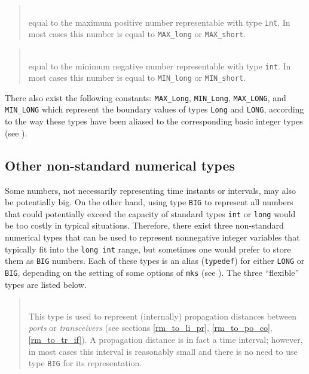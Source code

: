 \begin{quote}
\noindent{}\\ \hspace{0in}
equal to the maximum positive number representable with type {\tt int}.
In most cases this number is equal to {\tt MAX\_long} or {\tt MAX\_short}.
\end{quote}

\begin{quote}
\noindent{}\\ \hspace{0in}
equal to the minimum negative number representable with type {\tt int}.
In most cases this number is equal to {\tt MIN\_long} or {\tt MIN\_short}.
\end{quote}\medskip

There also exist the following constants: {\tt MAX\_Long}, {\tt MIN\_Long},
{\tt MAX\_LONG}, and {\tt MIN\_LONG} which represent the boundary values of
types {\tt Long} and {\tt LONG}, according to the way these types have been
aliased to the corresponding basic integer types (see ).

\subsection {Other non-standard numerical types}
\label {rm_mp_ot}

Some numbers, not necessarily representing time instants or intervals,
may also be potentially big.
On the other hand, using type {\tt BIG} to represent all numbers that
could potentially exceed the capacity of standard types {\tt int} or
{\tt long} would be too costly in typical situations.
Therefore, there exist three non-standard numerical types that can be used
to represent nonnegative integer variables
that typically fit into the {\tt long~int} range,
but sometimes one would prefer to store them as {\tt BIG} numbers.
Each of these types is an alias ({\tt typedef}) for either {\tt LONG}
or {\tt BIG}, depending on the setting of some options of {\tt mks}
(see ).
The three ``flexible'' types are listed below.

\medskip

\begin{quote}
\noindent{}\\ \hspace{0in}
This type is used to represent (internally)
propagation distances between {\em ports\/} or {\em transceivers\/}
(see sections \ref{rm_to_li_pr}, \ref{rm_to_po_co}, \ref{rm_to_tr_if}).
A propagation distance is in fact a time interval; however, in most cases
this interval is reasonably small and there is no need to use type {\tt BIG}
for its representation.
\end{quote}

